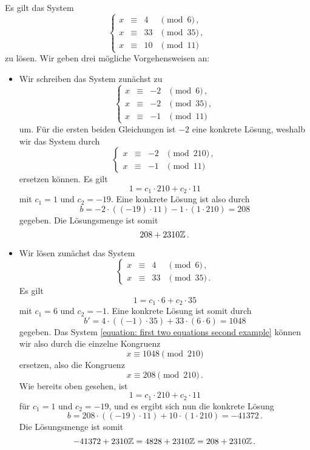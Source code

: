Es gilt das System
\[
  \left\{
    \begin{array}{rcrl}
      x &\equiv& 4  & \pmod{6}  \,, \\
      x &\equiv& 33 & \pmod{35} \,, \\
      x &\equiv& 10 & \pmod{11}
    \end{array}
  \right.
\]
zu lösen.
Wir geben drei mögliche Vorgehensweisen an:
\begin{itemize}
  \item
    Wir schreiben das System zunächst zu
    \[
      \left\{
        \begin{array}{rcrl}
          x &\equiv& -2  & \pmod{6} \,, \\
          x &\equiv& -2 & \pmod{35} \,, \\
          x &\equiv& -1 & \pmod{11}
        \end{array}
      \right.
    \]
    um.
    Für die ersten beiden Gleichungen ist $-2$ eine konkrete Lösung, weshalb wir das System durch
    \[
      \left\{
        \begin{array}{rcrl}
          x &\equiv& -2 & \pmod{210}  \,, \\
          x &\equiv& -1 & \pmod{11}
        \end{array}
      \right.
    \]
    ersetzen können.
    Es gilt
    \[
      1 = c_1 \cdot 210 + c_2 \cdot 11
    \]
    mit $c_1 = 1$ und $c_2 = -19$.
    Eine konkrete Lösung ist also durch
    \[
        b
      = -2 \cdot ((-19) \cdot 11) -1 \cdot (1 \cdot 210)
      = 208
    \]
    gegeben.
    Die Lösungsmenge ist somit
    \[
      208 + 2310 \mathbb{Z} \,.
    \]
    
  \item
    Wir lösen zunächst das System
    \begin{equation}
      \label{equation: first two equations second example}
      \left\{
        \begin{array}{rcrl}
          x &\equiv& 4  & \pmod{6}  \,, \\
          x &\equiv& 33 & \pmod{35} \,.
        \end{array}
      \right.
    \end{equation}
    Es gilt
    \[
      1 = c_1 \cdot 6 + c_2 \cdot 35
    \]
    mit $c_1 = 6$ und $c_2 = -1$.
    Eine konkrete Lösung ist somit durch
    \[
        b'
      = 4 \cdot ((-1) \cdot 35) + 33 \cdot (6 \cdot 6)
      = 1048
    \]
    gegeben.
    Das System \eqref{equation: first two equations second example} können wir also durch die einzelne Kongruenz
    \[
      x \equiv 1048 \pmod{210}
    \]
    ersetzen, also die Kongruenz
    \[
      x \equiv 208 \pmod{210} \,.
    \]
    Wie bereits oben gesehen, ist
    \[
        1
      = c_1 \cdot 210 + c_2 \cdot 11
    \]
    für $c_1 = 1$ und $c_2 = -19$, und es ergibt sich nun die konkrete Lösung
    \[
        b
      = 208 \cdot ((-19) \cdot 11) + 10 \cdot (1 \cdot 210)
      = -41372 \,.
    \]
    Die Lösungsmenge ist somit
    \[
        -41372 + 2310 \mathbb{Z}
      =   4828 + 2310 \mathbb{Z}
      =    208 + 2310 \mathbb{Z} \,.
    \]
    

\end{itemize}
